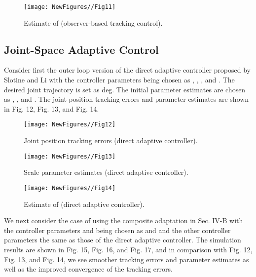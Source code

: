\documentclass[9pt,technote]{IEEEtran}
\begin{document}
{\begin{figure}
\centering
\begin{minipage}[t]{1.0\linewidth}
\centering
\texttt{[image: NewFigures//Fig11]}
\caption{Estimate of  (observer-based tracking control).}\label{fig:side:a}
\end{minipage}\end{figure}


\subsection{Joint-Space Adaptive Control}

Consider first the outer loop version of the direct adaptive controller proposed by Slotine and Li with the controller parameters being chosen as , , , and . The desired joint trajectory is set as  deg. The initial parameter estimates are chosen as , , and
. The joint position tracking errors and parameter estimates are shown in Fig. 12, Fig. 13, and Fig. 14.

\begin{figure}
\centering
\begin{minipage}[t]{1.0\linewidth}
\centering
\texttt{[image: NewFigures//Fig12]}
\caption{Joint position tracking errors (direct adaptive controller).}\label{fig:side:a}
\end{minipage}\end{figure}

\begin{figure}
\centering
\begin{minipage}[t]{1.0\linewidth}
\centering
\texttt{[image: NewFigures//Fig13]}
\caption{Scale parameter estimates (direct adaptive controller).}\label{fig:side:a}
\end{minipage}\end{figure}

\begin{figure}
\centering
\begin{minipage}[t]{1.0\linewidth}
\centering
\texttt{[image: NewFigures//Fig14]}
\caption{Estimate of  (direct adaptive controller).}\label{fig:side:a}
\end{minipage}\end{figure}

We next consider the case of using the composite adaptation in Sec. IV-B with the controller parameters  and 
being chosen as  and  and the other controller parameters the same as those of the direct adaptive controller. The simulation results are shown in Fig. 15, Fig. 16, and Fig. 17, and in comparison with Fig. 12, Fig. 13, and Fig. 14, we see smoother tracking errors and parameter estimates as well as the improved convergence of the tracking errors.


}
\end{document}
